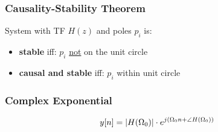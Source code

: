 \subsubsection{Causality-Stability Theorem}
        System with TF $H(z)$ and poles $p_i$ is:
        \begin{itemize}
            \item \textbf{stable} iff: $p_i$ \underline{not} on the unit circle
            \item \textbf{causal and stable} iff: $p_i$ within unit circle
        \end{itemize}
\subsubsection{Complex Exponential}
    \vspace{0.5em}
    $$
        y[n] = \abs{H(\Omega_0)} \cdot e^{j(\Omega_0 n +  \angle H(\Omega_0))}
    $$
    \vspace{-1em}